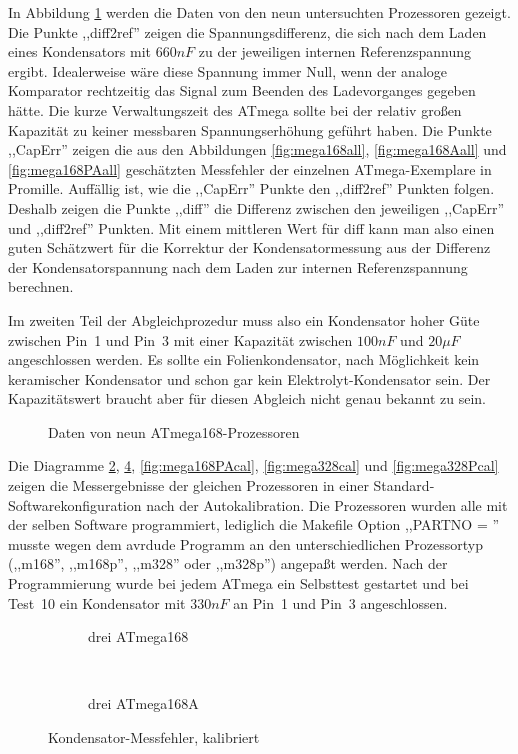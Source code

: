 In Abbildung \ref{fig:CompAdjust} werden die Daten von den neun untersuchten Prozessoren gezeigt.
Die Punkte ,,diff2ref'' zeigen die Spannungsdifferenz, die sich nach dem Laden eines Kondensators mit \(660 nF\) zu der
jeweiligen internen Referenzspannung ergibt. Idealerweise wäre diese Spannung immer Null, wenn der analoge
Komparator rechtzeitig das Signal zum Beenden des Ladevorganges gegeben hätte. Die kurze Verwaltungszeit des ATmega
sollte bei der relativ großen Kapazität zu keiner messbaren Spannungserhöhung geführt haben.
Die Punkte ,,CapErr'' zeigen die aus den Abbildungen \ref{fig:mega168all}, \ref{fig:mega168Aall} und \ref{fig:mega168PAall} 
geschätzten Messfehler der einzelnen ATmega-Exemplare in Promille.
Auffällig ist, wie die ,,CapErr'' Punkte den ,,diff2ref'' Punkten folgen.
Deshalb zeigen die Punkte ,,diff'' die Differenz zwischen den jeweiligen ,,CapErr'' und ,,diff2ref'' Punkten.
Mit einem mittleren Wert für diff kann man also einen guten Schätzwert für die Korrektur der Kondensatormessung aus der
Differenz der Kondensatorspannung nach dem Laden zur internen Referenzspannung berechnen.

Im zweiten Teil der Abgleichprozedur muss also ein Kondensator hoher Güte zwischen Pin~1 und Pin~3 mit einer
Kapazität zwischen \(100 nF\) und \(20 \mu F\) angeschlossen werden. 
Es sollte ein Folienkondensator, nach Möglichkeit kein keramischer Kondensator und schon gar kein
Elektrolyt-Kondensator sein. Der Kapazitätswert braucht aber für diesen Abgleich nicht genau bekannt zu sein.

\begin{figure}[H]
\centering

\caption{Daten von neun ATmega168-Prozessoren}
\label{fig:CompAdjust}
\end{figure}

Die Diagramme \ref{fig:mega168cal}, \ref{fig:mega168Acal}, \ref{fig:mega168PAcal},  \ref{fig:mega328cal} und
\ref{fig:mega328Pcal} zeigen die Messergebnisse
der gleichen Prozessoren in einer Standard-Softwarekonfiguration nach der Autokalibration.
Die Prozessoren wurden alle mit der selben Software programmiert, lediglich die Makefile Option ,,PARTNO = '' musste 
wegen dem avrdude Programm an den unterschiedlichen Prozessortyp (,,m168'', ,,m168p'', ,,m328'' oder ,,m328p'') angepaßt werden.
Nach der Programmierung wurde bei jedem ATmega ein
Selbsttest gestartet und bei Test~10 ein Kondensator mit \(330 nF\) an Pin~1 und Pin~3 angeschlossen.

\begin{figure}[H]
  \begin{subfigure}[b]{9cm}
    \centering
    \resizebox{9cm}{!}{}
    \caption{drei ATmega168}
    \label{fig:mega168cal}
  \end{subfigure}
  ~
  \begin{subfigure}[b]{9cm}
    \centering
    \resizebox{9cm}{!}{}
    \caption{drei ATmega168A}
    \label{fig:mega168Acal}
  \end{subfigure}
  \caption{Kondensator-Messfehler, kalibriert}
\end{figure}

